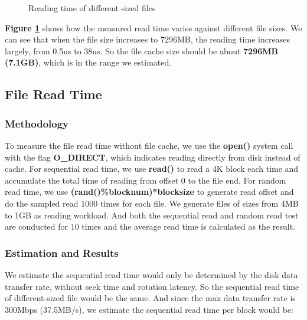 \begin{figure}[ht]
    \centering
    \caption{Reading time of different sized files}
    \label{file_cache_size}
\end{figure}

\textbf{Figure \ref{file_cache_size}} shows how the measured read time varies against different file sizes. We can see that when the file size increases to 7296MB, the reading time increases largely, from 0.5us to 38us. So the file cache size should be about \textbf{7296MB (7.1GB)}, which is in the range we estimated.

\subsection{File Read Time}
\label {File_read_time_section}
\subsubsection{Methodology}
To measure the file read time without file cache, we use the \textbf{open()} system call with the flag \textbf{O\_DIRECT}, which indicates reading directly from disk instead of cache. For sequential read time, we use \textbf{read()} to read a 4K block each time and accumulate the total time of reading from offset 0 to the file end. For random read time, we use \textbf{(rand()\%blocknum)*blocksize} to generate read offset and do the sampled read 1000 times for each file. We generate files of sizes from 4MB to 1GB as reading workload. And both the sequential read and random read test are conducted for 10 times and the average read time is calculated as the result.

\subsubsection{Estimation and Results}
We estimate the sequential read time would only be determined by the disk data transfer rate, without seek time and rotation latency. So the sequential read time of different-sized file would be the same. And since the max data transfer rate is 300Mbps (37.5MB/s), we estimate the sequential read time per block would be:

